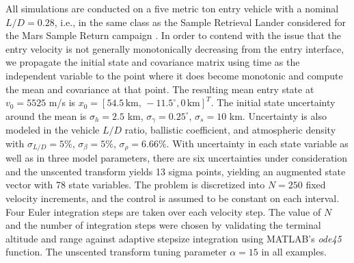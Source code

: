 \documentclass[journal ]{new-aiaa}
\begin{document}
All simulations are conducted on a five metric ton entry vehicle with a nominal $L/D=0.28$, i.e., in the same class as the Sample Retrieval Lander considered for the Mars Sample Return campaign \cite{MSR}. In order to contend with the issue that the entry velocity is not generally monotonically decreasing from the entry interface, we propagate the initial state and covariance matrix using time as the independent variable to the point where it does become monotonic and compute the mean and covariance at that point. The resulting  mean entry state at $v_0 = 5525$ m/s is $x_0 = [54.5\,\mathrm{km},\,-11.5^{\circ}, 0\,\mathrm{km}]^T$. The initial state uncertainty around the mean is $\sigma_h = 2.5$ km, $\sigma_{\gamma} = 0.25^{\circ}$, $\sigma_s = 10$ km. Uncertainty is also modeled in the vehicle $L/D$ ratio, ballistic coefficient, and atmospheric density with $\sigma_{L/D} = 5\%$, $\sigma_{\beta} = 5\%$, $\sigma_{\rho} = 6.66\%$. With uncertainty in each state variable as well as in three model parameters, there are six uncertainties under consideration and the unscented transform yields 13 sigma points, yielding an augmented state vector with 78 state variables. The problem is discretized into $N=250$ fixed velocity increments, and the control is assumed to be constant on each interval. Four Euler integration steps are taken over each velocity step. The value of $ N $ and the number of integration steps were chosen by validating the terminal altitude and range against adaptive stepsize integration using MATLAB's \textit{ode45} function. The unscented transform tuning parameter $\alpha=15$ in all examples. 

\end{document}
